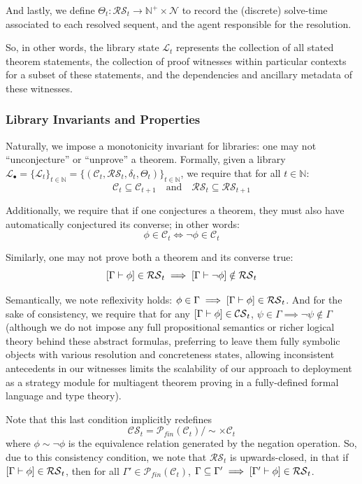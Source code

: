 And lastly, we define $\Theta_t : \mathcal{RS}_t\to\mathbb N^+ \times \mathcal N$ to record the (discrete) solve-time associated to each resolved sequent, and the agent responsible for the resolution. 


So, in other words, the library state $\mathcal{L}_t$ represents the collection of all stated theorem statements, the collection of proof witnesses within particular contexts for a subset of these statements, and the dependencies and ancillary metadata of these witnesses.

\subsubsection{Library Invariants and Properties}

Naturally, we impose a monotonicity invariant for libraries: one may not ``unconjecture'' or ``unprove'' a theorem. Formally, given a library $\mathcal{L}_\bullet = \{\mathcal{L}_t\}_{t \in \mathbb{N}}=\{(\mathcal{C}_t,\mathcal{RS}_t,\delta_t,\Theta_t)\}_{t \in \mathbb{N}}$, we require that for all $t \in \mathbb{N}$:
\[\mathcal{C}_{t} \subseteq \mathcal{C}_{t+1} \quad \text{and} \quad \mathcal{RS}_{t} \subseteq \mathcal{RS}_{t+1}\]

Additionally, we require that if one conjectures a theorem, they must also have automatically conjectured its converse; in other words:
\[\phi \in \mathcal{C}_t \iff \neg\phi \in \mathcal{C}_t\]

Similarly, one may not prove both a theorem and its converse true: 
\[[\Gamma \vdash \phi] \in \mathcal{RS}_t \implies [\Gamma \vdash \neg \phi] \notin \mathcal{RS}_t\]

Semantically, we note reflexivity holds: $\phi \in \Gamma \implies [\Gamma \vdash \phi] \in \mathcal{RS}_t$. And for the sake of consistency, we require that for any $[\Gamma \vdash \phi] \in \mathcal{CS}_t$, $\psi \in \Gamma \implies \neg\psi \notin \Gamma$ (although we do not impose any full propositional semantics or richer logical theory behind these abstract formulas, preferring to leave them fully symbolic objects with various resolution and concreteness states, allowing inconsistent antecedents in our witnesses limits the scalability of our approach to deployment as a strategy module for multiagent theorem proving in a fully-defined formal language and type theory). 

Note that this last condition implicitly redefines
\[\mathcal{CS}_t = \mathcal{P}_{fin}(\mathcal{C}_t)/\sim \times \mathcal{C}_t \] where $\phi\sim\neg\phi$ is the equivalence relation generated by the negation operation. So, due to this consistency condition, we note that $\mathcal{RS}_t$ is upwards-closed, in that if $[\Gamma \vdash \phi] \in \mathcal{RS}_t$, then for all $\Gamma' \in \mathcal{P}_{fin}(\mathcal{C}_t)$, $\Gamma \subseteq \Gamma' \implies [\Gamma'\vdash\phi]\in \mathcal{RS}_t$.

